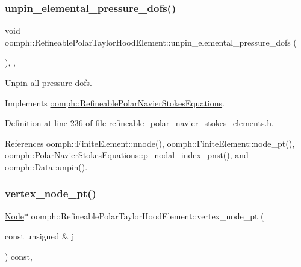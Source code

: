 \subsubsection{\texorpdfstring{unpin\+\_\+elemental\+\_\+pressure\+\_\+dofs()}{unpin\_elemental\_pressure\_dofs()}}
{\footnotesize\ttfamily void oomph\+::\+Refineable\+Polar\+Taylor\+Hood\+Element\+::unpin\+\_\+elemental\+\_\+pressure\+\_\+dofs (\begin{DoxyParamCaption}{ }\end{DoxyParamCaption})\hspace{0.3cm}{\ttfamily [inline]}, {\ttfamily [private]}, {\ttfamily [virtual]}}



Unpin all pressure dofs. 



Implements \hyperlink{classoomph_1_1RefineablePolarNavierStokesEquations_add592ab49fc813016f9d0d22bc82a68f}{oomph\+::\+Refineable\+Polar\+Navier\+Stokes\+Equations}.



Definition at line 236 of file refineable\+\_\+polar\+\_\+navier\+\_\+stokes\+\_\+elements.\+h.



References oomph\+::\+Finite\+Element\+::nnode(), oomph\+::\+Finite\+Element\+::node\+\_\+pt(), oomph\+::\+Polar\+Navier\+Stokes\+Equations\+::p\+\_\+nodal\+\_\+index\+\_\+pnst(), and oomph\+::\+Data\+::unpin().

\mbox{\label{classoomph_1_1RefineablePolarTaylorHoodElement_aa484bc80b8f15cd952d837c762700fd8}} 
\subsubsection{\texorpdfstring{vertex\+\_\+node\+\_\+pt()}{vertex\_node\_pt()}}
{\footnotesize\ttfamily \hyperlink{classoomph_1_1Node}{Node}$\ast$ oomph\+::\+Refineable\+Polar\+Taylor\+Hood\+Element\+::vertex\+\_\+node\+\_\+pt (\begin{DoxyParamCaption}\item[{const unsigned \&}]{j }\end{DoxyParamCaption}) const\hspace{0.3cm}{\ttfamily [inline]}, {\ttfamily [virtual]}}




